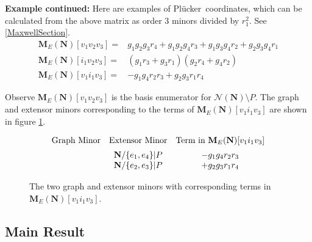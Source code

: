 \documentclass[12pt]{article}
\theoremstyle{definition}
\newcommand{\ext}[1]{\ensuremath{\mathbf{#1}}}
\newcommand{\Plucker}{Pl\"{u}cker\ }
\begin{document}
\textbf{Example continued:}
Here are examples of \Plucker coordinates, which can be calculated from
the above matrix as order 3 minors divided by $r_1^2$.
See \textsection \ref{MaxwellSection}.
\begin{eqnarray*}
\ext{M}_E(\ext{N})[v_1v_2v_3]=&g_1g_2g_3r_4+g_1g_2g_4r_3+g_1g_3g_4r_2+g_2g_3g_4r_1 \\
\ext{M}_E(\ext{N})[i_1v_2v_3]=&(g_1r_3+g_3r_1)(g_2r_4+g_4r_2) \\
\ext{M}_E(\ext{N})[v_1i_1v_3]=&-g_1g_4r_2r_3+g_2g_3r_1r_4
\end{eqnarray*}

Observe $\ext{M}_E(\ext{N})[v_1v_2v_3]$ 
is the basis enumerator for $\mathcal{N}(\ext{N})\setminus P$.
The graph and extensor minors corresponding to the terms
of $\ext{M}_E(\ext{N})[v_1i_1v_3]$ are shown in figure \ref{2MinFig}.
\begin{figure}
\[
\begin{array}{ccc}
\text{Graph Minor} & \text{Extensor Minor} & 
\text{Term in } \ext{M}_E(\ext{N})[v_1i_1v_3] \\[.5em]
\parbox[c]{1in}{} & \ext{N}/\{e_1,e_4\}|P & -g_1g_4r_2r_3    \\
\parbox[c]{1in}{} & \ext{N}/\{e_2,e_3\}|P & +g_2g_3r_1r_4 
\end{array}
\]
\caption{The two graph and extensor minors with corresponding terms
in $\ext{M}_E(\ext{N})[v_1i_1v_3]$.}
\label{2MinFig}
\end{figure}

\subsection{Main Result}
\end{document}
